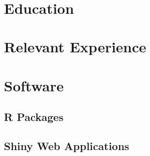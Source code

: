 \documentclass[11pt,a4paper]{moderncv}
\title{ \newline{}
 }
\begin{document}
 

\maketitle
\vspace*{-10mm}

%
%

\section{Education}




\section{Relevant Experience}


\section{Software}
\subsection{R Packages}



\vspace{1em}
\subsection{Shiny Web Applications}




%
%
%
%
%
\end{document}
